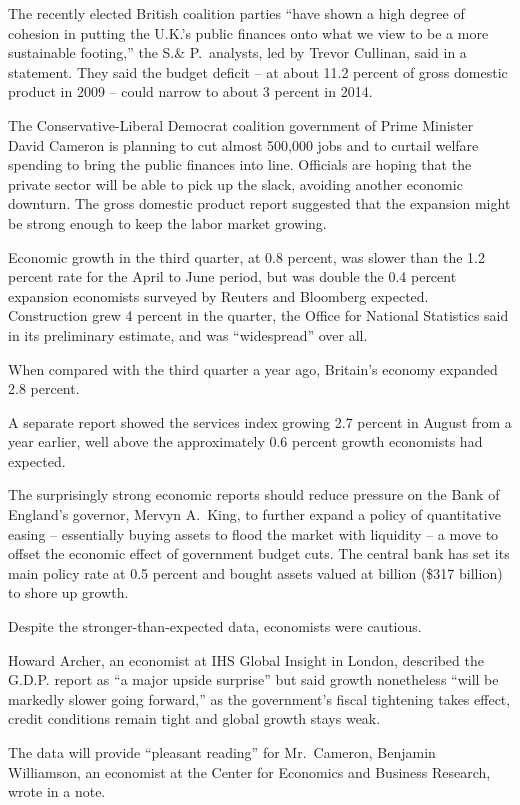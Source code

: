 ﻿\documentclass[12pt]{article}
\begin{document}
The recently elected British coalition parties ``have shown a high degree of cohesion in putting the
U.K.'s public finances onto what we view to be a more sustainable footing,'' the S.\& P.~analysts,
led by Trevor Cullinan, said in a statement. They said the budget deficit -- at about 11.2 percent
of gross domestic product in 2009 -- could narrow to about 3 percent in 2014.

The Conservative-Liberal Democrat coalition government of Prime Minister David Cameron is planning
to cut almost 500,000 jobs and to curtail welfare spending to bring the public finances into line.
Officials are hoping that the private sector will be able to pick up the slack, avoiding another
economic downturn. The gross domestic product report suggested that the expansion might be strong
enough to keep the labor market growing.

Economic growth in the third quarter, at 0.8 percent, was slower than the 1.2 percent rate for the
April to June period, but was double the 0.4 percent expansion economists surveyed by Reuters and
Bloomberg expected. Construction grew 4 percent in the quarter, the Office for National Statistics
said in its preliminary estimate, and was ``widespread'' over all.

When compared with the third quarter a year ago, Britain's economy expanded 2.8 percent.

A separate report showed the services index growing 2.7 percent in August from a year earlier, well
above the approximately 0.6 percent growth economists had expected.

The surprisingly strong economic reports should reduce pressure on the Bank of England's governor,
Mervyn A.~King, to further expand a policy of quantitative easing -- essentially buying assets to
flood the market with liquidity -- a move to offset the economic effect of government budget cuts.
The central bank has set its main policy rate at 0.5 percent and bought assets valued at
 billion (\$317 billion) to shore up growth.

Despite the stronger-than-expected data, economists were cautious.

Howard Archer, an economist at IHS Global Insight in London, described the G.D.P. report as ``a
major upside surprise'' but said growth nonetheless ``will be markedly slower going forward,'' as
the government's fiscal tightening takes effect, credit conditions remain tight and global growth
stays weak.

The data will provide ``pleasant reading'' for Mr.~Cameron, Benjamin Williamson, an economist at the
Center for Economics and Business Research, wrote in a note.
\end{document}

